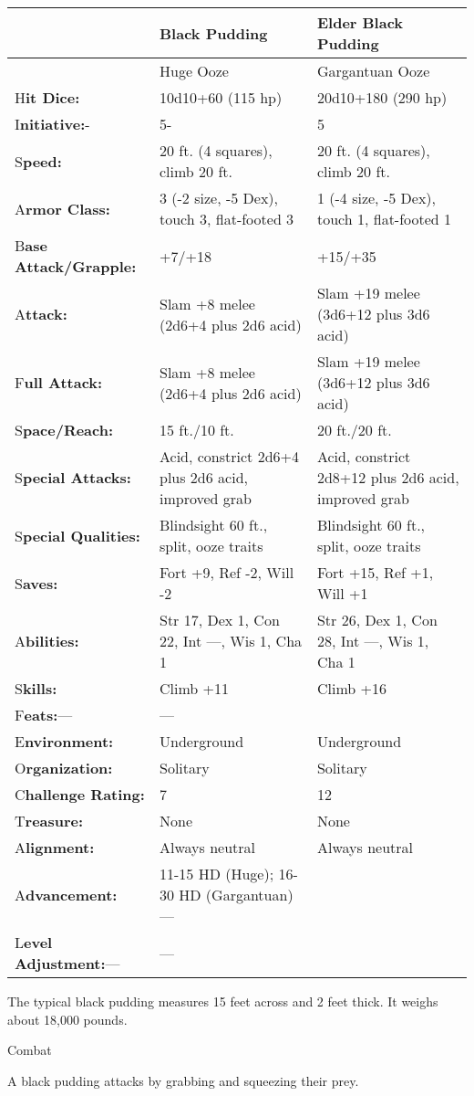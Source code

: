 \documentclass{article}
\begin{document}
\begin{tabular}{|>{\raggedright}p{62pt}|>{\raggedright}p{120pt}|>{\raggedright}p{131pt}|}
\hline
 & B\textbf{lack Pudding} & E\textbf{lder Black Pudding}\tabularnewline
\hline
 & Huge Ooze & Gargantuan Ooze\tabularnewline
\hline
H\textbf{it Dice:} & 10d10+60 (115 hp)  & 20d10+180 (290 hp)\tabularnewline
\hline
I\textbf{nitiative:}- & 5- & 5\tabularnewline
\hline
S\textbf{peed:} & 20 ft. (4 squares), climb 20 ft.  & 20 ft. (4 squares), climb 
20 ft.\tabularnewline
\hline
A\textbf{rmor Class:} & 3 (-2 size, -5 Dex), touch 3, flat-footed 3 & 1 (-4 size, 
-5 Dex), touch 1, flat-footed 1\tabularnewline
\hline
B\textbf{ase Attack/Grapple:} & +7/+18  & +15/+35\tabularnewline
\hline
A\textbf{ttack:} & Slam +8 melee (2d6+4 plus 2d6 acid)  & Slam +19 melee (3d6+12 
plus 3d6 acid)\tabularnewline
\hline
F\textbf{ull Attack:} & Slam +8 melee (2d6+4 plus 2d6 acid)  & Slam +19 melee (3d6+12 
plus 3d6 acid)\tabularnewline
\hline
S\textbf{pace/Reach:} & 15 ft./10 ft. & 20 ft./20 ft.\tabularnewline
\hline
S\textbf{pecial Attacks:} & Acid, constrict 2d6+4 plus 2d6 acid, improved grab 
 & Acid, constrict 2d8+12 plus 2d6 acid, improved grab\tabularnewline
\hline
S\textbf{pecial Qualities:} & Blindsight 60 ft., split, ooze traits & Blindsight 
60 ft., split, ooze traits\tabularnewline
\hline
S\textbf{aves:} & Fort +9, Ref -2, Will -2 & Fort +15, Ref +1, Will +1\tabularnewline
\hline
A\textbf{bilities:} & Str 17, Dex 1, Con 22, Int ---, Wis 1, Cha 1 & Str 26, Dex 
1, Con 28, Int ---, Wis 1, Cha 1\tabularnewline
\hline
S\textbf{kills:} & Climb +11 & Climb +16\tabularnewline
\hline
F\textbf{eats:}--- & --- & \tabularnewline
\hline
E\textbf{nvironment:} & Underground & Underground\tabularnewline
\hline
O\textbf{rganization:} & Solitary & Solitary\tabularnewline
\hline
C{\small{}\textbf{hallenge Rating:}} & 7 & 12\tabularnewline
\hline
T\textbf{reasure:} & None & None\tabularnewline
\hline
A\textbf{lignment:} & Always neutral & Always neutral\tabularnewline
\hline
A\textbf{dvancement:} & 11-15 HD (Huge); 16-30 HD (Gargantuan)--- & \tabularnewline
\hline
L\textbf{evel Adjustment:}--- & --- & \tabularnewline
\hline
\end{tabular}

\vspace{12pt}
The typical black pudding measures 15 feet across and 2 feet thick. It weighs about 
18,000 pounds.

Combat

A black pudding attacks by grabbing and squeezing their prey.
\end{document}
